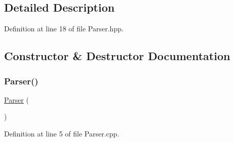\subsection{Detailed Description}


Definition at line 18 of file Parser.\+hpp.



\subsection{Constructor \& Destructor Documentation}
\mbox{\label{classft_1_1_parser_a6bfb42ee628e026bebda9adb7ae8b895}} 
\subsubsection{\texorpdfstring{Parser()}{Parser()}}
{\footnotesize\ttfamily \hyperlink{classft_1_1_parser}{Parser} (\begin{DoxyParamCaption}{ }\end{DoxyParamCaption})}



Definition at line 5 of file Parser.\+cpp.


